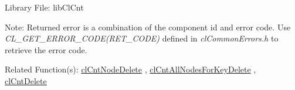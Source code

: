 \begin{Desc}
\item[Library File:]lib\-Cl\-Cnt\end{Desc}
\begin{Desc}
\item[Note:]Returned error is a combination of the component id and error code. Use \textit{CL\_\-GET\_\-ERROR\_\-CODE(RET\_\-CODE)} defined in \textit{clCommonErrors.h} to retrieve the error code.\end{Desc}
\begin{Desc}
\item[Related Function(s):]\hyperlink{pagecnt108}{cl\-Cnt\-Node\-Delete} , \hyperlink{pagecnt107}{cl\-Cnt\-All\-Nodes\-For\-Key\-Delete} , 
\hyperlink{pagecnt120}{cl\-Cnt\-Delete} \end{Desc}


\newpage
